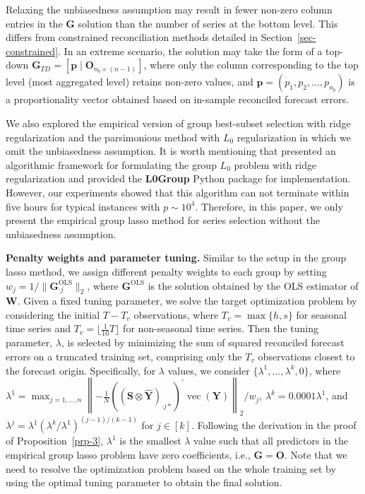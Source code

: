 \documentclass[
  11pt]{article}
\theoremstyle{plain}
\theoremstyle{remark}
\begin{document}
Relaxing the unbiasedness assumption may result in fewer non-zero column
entries in the \(\bm{G}\) solution than the number of series at the
bottom level. This differs from constrained reconciliation methods
detailed in Section~\ref{sec-constrained}. In an extreme scenario, the
solution may take the form of a top-down
\(\bm{G}_{TD}=[\bm{p} \mid \bm{O}_{n_b \times (n-1)}]\), where only the
column corresponding to the top level (most aggregated level) retains
non-zero values, and \(\bm{p} = (p_1, p_2, \ldots, p_{n_b})\) is a
proportionality vector obtained based on in-sample reconciled forecast
errors.

We also explored the empirical version of group best-subset selection
with ridge regularization and the parsimonious method with \(L_0\)
regularization in which we omit the unbiasedness assumption. It is worth
mentioning that \citet{Hazimeh2023-ie} presented an algorithmic
framework for formulating the group \(L_0\) problem with ridge
regularization and provided the \textbf{L0Group} Python package for
implementation. However, our experiments showed that this algorithm can
not terminate within five hours for typical instances with
\(p \sim 10^4\). Therefore, in this paper, we only present the empirical
group lasso method for series selection without the unbiasedness
assumption.

\textbf{Penalty weights and parameter tuning.} Similar to the setup in
the group lasso method, we assign different penalty weights to each
group by setting \(w_j = 1/\|\bm{G}_{\cdot j}^{\text{OLS}}\|_2\), where
\(\bm{G}^{\text{OLS}}\) is the solution obtained by the OLS estimator of
\(\bm{W}\). Given a fixed tuning parameter, we solve the target
optimization problem by considering the initial \(T-T_v\) observations,
where \(T_v = \max\{h, s\}\) for seasonal time series and
\(T_v = \lfloor \frac{1}{10}T \rfloor\) for non-seasonal time series.
Then the tuning parameter, \(\lambda\), is selected by minimizing the
sum of squared reconciled forecast errors on a truncated training set,
comprising only the \(T_v\) observations closest to the forecast origin.
Specifically, for \(\lambda\) values, we consider
\(\{\lambda^{1},\dots,\lambda^{k}, 0\}\), where
\(\lambda^{1} = \max_{j=1, \ldots, n}\left\|-\frac{1}{N}\left(\left(\bm{S} \otimes \hat{\bm{Y}}\right)_{\cdot j*}\right)^{\prime} \operatorname{vec}(\bm{Y})\right\|_2 / w_j\),
\(\lambda^{k} = 0.0001\lambda^{1}\), and
\(\lambda^{j} = \lambda^{1}\left(\lambda^{k} / \lambda^{1}\right)^{(j-1) / (k-1)}\)
for \(j \in [k]\). Following the derivation in the proof of
Proposition~\ref{prp-3}, \(\lambda^{1}\) is the smallest \(\lambda\)
value such that all predictors in the empirical group lasso problem have
zero coefficients, i.e., \(\bm{G} = \bm{O}\). Note that we need to
resolve the optimization problem based on the whole training set by
using the optimal tuning parameter to obtain the final solution.
\end{document}
